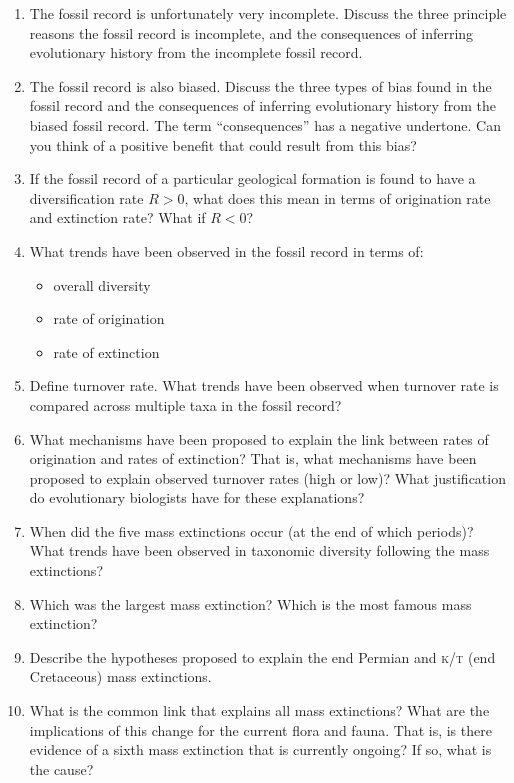 \documentclass[letterpaper]{tufte-handout}
\begin{document}
\begin{enumerate}
	
	\item The fossil record is unfortunately very incomplete.  Discuss the three principle reasons the fossil record is incomplete, and the consequences of inferring evolutionary history from the incomplete fossil record.

	\item The fossil record is also biased.  Discuss the three types of bias found in the fossil record and the consequences of inferring evolutionary history from the biased fossil record.  The term ``consequences'' has a negative undertone.  Can you think of a positive benefit that could result from this bias?

	\item If the fossil record of a particular geological formation is found to have a diversification rate $R > 0$, what does this mean in terms of origination rate and extinction rate?  What if $R < 0$?

	\item What trends have been observed in the fossil record in terms of:
	\begin{itemize}
		\item overall diversity
		\item rate of origination
		\item rate of extinction
	\end{itemize}
	
	\item Define turnover rate.  What trends have been observed when turnover rate is compared across multiple taxa in the fossil record?

	\item What mechanisms have been proposed to explain the link between rates of origination and rates of extinction?  That is, what mechanisms have been proposed to explain observed turnover rates (high or low)?  What justification do evolutionary biologists have for these explanations?  

	\item When did the five mass extinctions occur (at the end of which periods)?  What trends have been observed in taxonomic diversity following the mass extinctions?

	\item Which was the largest mass extinction?  Which is the most famous mass extinction?

	\item Describe the hypotheses proposed to explain the end Permian and \textsc{k/t} (end Cretaceous) mass extinctions.

	\item What is the common link that explains all mass extinctions?  What are the implications of this change for the current flora and fauna. That is, is there evidence of a sixth mass extinction that is currently ongoing? If so, what is the cause?

\end{enumerate}
\end{document}
